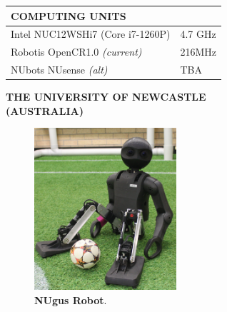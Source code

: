 \documentclass[10pt,a4paper]{article}
\begin{document}
\begin{multicols}{2}
\begin{table}[H]
	\begin{tabular}{|m{5.9cm}|m{1.25cm}|}
		\hline
		\rowcolor[rgb]{0.0, 0.0, 0.0}
		{\color{textcolour}\textbf{{COMPUTING UNITS}}} & \\
		\hline
        Intel NUC12WSHi7 (Core i7-1260P) & 4.7 GHz \\
		\hline
        Robotis OpenCR1.0 \textit{(current)} & 216MHz \\
		\hline
        NUbots NUsense \textit{(alt)} & TBA \\
		\hline
	\end{tabular}
\end{table}

\columnbreak

\begin{center}
	\colorbox[rgb]{0.0, 0.0, 0.0}
	{
	\begin{minipage}[c][3.5em][c]{0.45\textwidth}
		\begin{center}
			{\color{textcolour}
				{
				\textbf{THE UNIVERSITY OF NEWCASTLE \\
				(AUSTRALIA)}
				}
			}
		\end{center}
	\end{minipage}
	}
\end{center}

\begin{figure}[H]
	\begin{center}
		\includegraphics[width=0.47\textwidth]{Kev1}\\
		\textbf{NUgus Robot}.
	\end{center}
\end{figure}

\end{multicols}
\end{document}
